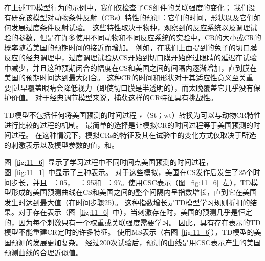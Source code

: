 {在上述TD模型行为的示例中，我们仅检查了CS组件的关联强度的变化；
我们没有研究该模型对动物条件反射（CRs）特性的预测：它们的时间，形状以及它们如何发展过度条件反射试验。
这些特性取决于物种，观察到的反应系统以及调理试验的参数，但是在许多使用不同动物和不同反应系统的实验中，CR的大小或CR的概率随着美国的预期时间的接近而增加。
例如，在我们上面提到的兔子的切口膜反应的经典调理中，过度调理试验从CS开始到切口膜开始穿过眼睛的延迟在试验中减少，并且这种预期闭合的幅度在CS和美国之间的间隔内逐渐增加，直到膜在美国的预期时间达到最大闭合。
这种CR的时间和形状对于其适应性意义至关重要|过早覆盖眼睛会降低视力（即使切口膜是半透明的），而太晚覆盖它几乎没有保护价值。
对于经典调节模型来说，捕获这样的CR特征具有挑战性。


TD模型不包括任何将美国预测的时间过程 v（St；wt）转换为可以与动物CR特性进行比较的过程的机制。
最简单的选择是让模拟CR的时间过程等于美国预测的时间过程。
在这种情况下，模拟CRs的特征及其在试验中的变化方式仅取决于所选的刺激表示以及模型参数的值，和。


图~\ref{fig:11_6}~显示了学习过程中不同时间点美国预测的时间过程，图~\ref{fig:11_1}~中显示了三种表示。
对于这些模拟，美国在CS发作后发生了25个时间步长，并且=：05，=：95和=：97。使用CSC表示（图~\ref{fig:11_6}~左），TD模型形成的美国预测曲线在CS和美国之间的整个间隔内呈指数增长，直到它在美国发生时达到最大值（在时间步骤25）。
这种指数增长是TD模型学习规则折扣的结果。对于存在表示（图~\ref{fig:11_6}~中），当刺激存在时，美国的预测几乎是恒定的，因为每个刺激只有一个权重或关联强度需要学习。
因此，具有存在表示的TD模型不能重建CR定时的许多特征。
使用MS表示（右图~\ref{fig:11_6}），TD模型的美国预测的发展更加复杂。
经过200次试验后，预测的曲线是用CSC表示产生的美国预测曲线的合理近似值。


}
